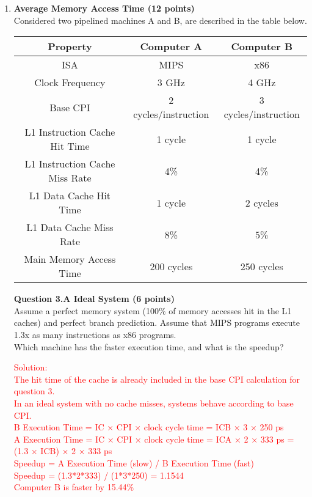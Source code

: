 \documentclass[a4paper,10pt]{article}
\begin{document}
\begin{enumerate}
\item \textbf{Average Memory Access Time (12 points)} \\
Considered two pipelined machines A and B, are described in the table below.
 \begin{center}
\begin{tabular}{ccc}
\toprule  
\textbf{Property} & \textbf{ Computer A} & \textbf{ Computer B}  \\
\midrule  
ISA & MIPS & x86\\
\midrule
Clock Frequency & 3 GHz & 4 GHz\\
\midrule
Base CPI & 2 cycles/instruction & 3 cycles/instruction\\
\midrule
L1 Instruction Cache Hit Time & 1 cycle & 1 cycle\\
\midrule
L1 Instruction Cache Miss Rate & 4\%  & 4\% \\
\midrule
L1 Data Cache Hit Time & 1 cycle & 2 cycles\\
\midrule
L1 Data Cache Miss Rate & 8\%  & 5\% \\
\midrule
Main Memory Access Time & 200 cycles  & 250 cycles \\
\bottomrule 
\end{tabular}
\end{center}

\textbf{Question 3.A Ideal System (6 points)}\\
Assume a perfect memory system (100\% of memory accesses hit in the L1 caches) and perfect branch prediction. Assume that MIPS programs execute 1.3x as many instructions as x86 programs. \\
Which machine has the faster execution time, and what is the speedup?\\

\noindent\fbox
{%
    \parbox{\linewidth}
    {%
\textcolor{red}{
    Solution: \\
       The hit time of the cache is already included in the base CPI calculation for question 3.\\
       In an ideal system with no cache misses, systems behave according to base CPI.\\
       B Execution Time = IC × CPI × clock cycle time = ICB × 3 × 250 ps\\
       A Execution Time = IC × CPI × clock cycle time = ICA × 2 × 333 ps = (1.3 × ICB) × 2 × 333 ps\\
       Speedup = A Execution Time (slow) / B Execution Time (fast)\\
       Speedup = (1.3*2*333) / (1*3*250) = 1.1544\\
       Computer B is faster by 15.44\%
       }
    }%
}


\end{enumerate}
\end{document}
